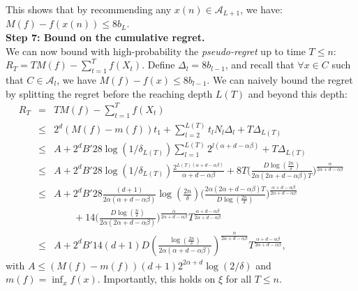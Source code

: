 \documentclass[final,12pt]{colt2018}
\begin{document}
This shows that by recommending any $x(n) \in \mathcal A_{L+1}$, we have: $M(f) - f(x(n)) \leq 8b_L$.\\

\textbf{Step 7: Bound on the cumulative regret.}\\
We can now bound with high-probability the \textit{pseudo-regret} up to time $T \leq n$: $R_T = TM(f) - \sum_{t=1}^T f(X_t)$. Define $\Delta_l = 8b_{l-1}$, and recall that $\forall x \in C$ such that $C \in \mathcal{A}_{l}$, we have $M(f) - f(x) \leq 8 b_{l-1}$. We can naively bound the regret by splitting the regret before the reaching depth $L(T)$ and beyond this depth:
\begin{eqnarray*}
R_T & = & TM(f) - \sum_{t=1}^T f(X_t)\\
& \leq & 2^d (M(f) - m(f))t_1 + \sum_{l=2}^{L(T)} t_l N_l \Delta_l + T\Delta_{L(T)}\\
& \leq & A + 2^d B' 28 \log(1/\delta_{L(T)}) \sum_{l=1}^{L(T)} 2^{l(\alpha + d - \alpha\beta)} + T \Delta_{L(T)}\\
& \leq & A + 2^d B' 28 \log(1/\delta_{L(T)}) \frac{2^{L(T)(\alpha + d - \alpha\beta)}}{\alpha + d - \alpha\beta} + 8T \Big(\frac{D\log(\frac{2n}{\delta})}{2\alpha(2\alpha + d - \alpha\beta)T}\Big)^{\frac{\alpha}{2\alpha + d - \alpha\beta}}\\
& \leq & A + 2^d B' 28\frac{(d+1)}{2\alpha(\alpha+d-\alpha\beta)}\log(\frac{2n}{\delta})\Big(\frac{2\alpha(2\alpha + d - \alpha\beta)T}{D \log(\frac{2n}{\delta})}\Big)^{\frac{\alpha+d-\alpha\beta}{2\alpha+d-\alpha\beta}}\\
& & \quad \quad +14 \Big(\frac{D \log(\frac{n}{\delta})}{2\alpha(2\alpha + d - \alpha\beta)}\Big)^{\frac{\alpha}{2\alpha + d - \alpha\beta}}T^{\frac{\alpha+d-\alpha\beta}{2\alpha+d-\alpha\beta}}\\
& \leq & A + 2^d B' 14(d+1)D \left(\frac{\log(\frac{2n}{\delta})}{2\alpha(\alpha + d -\alpha\beta)}\right)^{\frac{\alpha}{2\alpha+d-\alpha\beta}}T^{\frac{\alpha+d-\alpha\beta}{2\alpha+d-\alpha\beta}},
\end{eqnarray*}
with $A \leq (M(f) - m(f))(d+1)2^{2\alpha+d}\log(2/\delta)$ and $m(f) = \inf_x f(x)$. Importantly, this holds on $\xi$ for all $T \leq n$.\\
\end{document}

